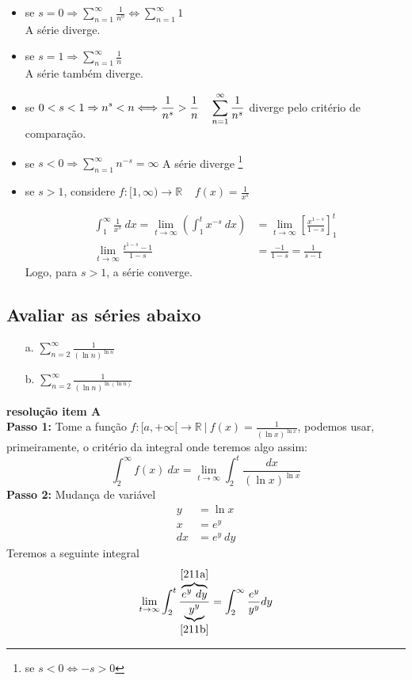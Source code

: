 \documentclass[12pt,openany]{book}
\begin{document}
\begin{itemize}
\item se $\displaystyle{s = 0} \Rightarrow \sum_{n = 1}^{\infty} \frac{1}{n^0} \Longleftrightarrow \sum_{n = 1}^{\infty} 1$ \\ A série diverge.
\item se $\displaystyle{s = 1} \Rightarrow \sum_{n = 1}^{\infty} \frac{1}{n}$ \\ A série também diverge.
\item se $\displaystyle{0 < s < 1 \Rightarrow n^s < n \Longleftrightarrow \frac{1}{n^s} > \frac{1}{n} \ \ \ \vspace{5mm} \sum_{n = 1}^{\infty} \frac{1}{n^s}}$ diverge pelo critério de comparação.
\item se $\displaystyle{s < 0} \Rightarrow \sum_{n = 1}^{\infty} n^{-s} = \infty$ A série diverge \footnote{se $s < 0 \Longleftrightarrow -s > 0$}
\item se $s > 1$, considere $f: [1, \infty) \rightarrow \mathds{R} \ \ \ \ \ f(x) = \frac{1}{x^s}$

\begin{align*}
\int_1^{\infty} \frac{1}{x^s} \ dx = \lim_{t \rightarrow \infty} \left(\int_1^t x^{-s} \ dx \right) &= \lim_{t \rightarrow \infty} \left[\frac{x^{1-s}}{1-s} \right]_1^t \\
\lim_{t \rightarrow \infty} \frac{t^{1-s}-1}{1-s} &= \frac{-1}{1-s} = \frac{1}{s-1}
\end{align*}
Logo, para $s > 1$, a série converge.
\end{itemize}

\subsection*{Avaliar as séries abaixo} \label{avaliar}
\begin{itemize}
\item [a.] $\displaystyle{\sum_{n=2}^{\infty} \frac{1}{(\ln n)^{\ln n}}}$ 
\item [b.] $\displaystyle{\sum_{n=2}^{\infty} \frac{1}{(\ln n)^{\ln(\ln n)}}}$
\end{itemize}
\textbf{resolução item A}
\\
\textbf{Passo 1:} Tome a função $f:[a, +\infty[ \rightarrow \mathds{R} \ | \  f(x) = \displaystyle{\frac{1}{(\ln x)^{\ln x}}}$, podemos usar, primeiramente, o critério da integral onde teremos algo assim: $$\int_2^{\infty} f(x) \ dx = \lim_{t \rightarrow \infty} \int_2^t \displaystyle{\frac{dx}{(\ln x)^{\ln x}}}$$
\textbf{Passo 2:} Mudança de variável
\begin{align}
y &= \ln x \\ \label{211a}
x &= e^y \\ 
dx &= e^y \ dy \label{211b}
\end{align}
Teremos a seguinte integral $$\lim_{t \rightarrow \infty} \int_2^t \displaystyle{\frac{\overbrace{e^y \ dy}^{\ref{211a}}}{\underbrace{y^y}_{\ref{211b}}}} = \int_2^{\infty} \frac{e^y}{y^y} dy$$
\end{document}
